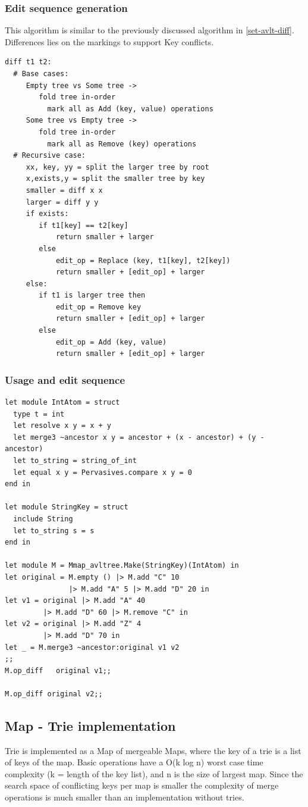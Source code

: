 \documentclass{article}
\begin{document}
\subsubsection{Edit sequence generation}
This algorithm is similar to the previously discussed algorithm in \ref{set-avlt-diff}. Differences lies on the markings to support Key conflicts.

\begin{lstlisting}
diff t1 t2:
  # Base cases:
     Empty tree vs Some tree -> 
     	fold tree in-order 
     	  mark all as Add (key, value) operations
     Some tree vs Empty tree ->
     	fold tree in-order 
     	  mark all as Remove (key) operations
  # Recursive case:
     xx, key, yy = split the larger tree by root
     x,exists,y = split the smaller tree by key
     smaller = diff x x
  	 larger = diff y y
     if exists:
     	if t1[key] == t2[key]
     		return smaller + larger
        else
        	edit_op = Replace (key, t1[key], t2[key])
            return smaller + [edit_op] + larger
     else:
     	if t1 is larger tree then 
        	edit_op = Remove key
            return smaller + [edit_op] + larger
        else 
        	edit_op = Add (key, value)
        	return smaller + [edit_op] + larger
\end{lstlisting}

\subsubsection{Usage and edit sequence}
\begin{lstlisting}
let module IntAtom = struct
  type t = int
  let resolve x y = x + y
  let merge3 ~ancestor x y = ancestor + (x - ancestor) + (y - ancestor)
  let to_string = string_of_int
  let equal x y = Pervasives.compare x y = 0 
end in

let module StringKey = struct
  include String
  let to_string s = s 
end in

let module M = Mmap_avltree.Make(StringKey)(IntAtom) in
let original = M.empty () |> M.add "C" 10 
               |> M.add "A" 5 |> M.add "D" 20 in
let v1 = original |> M.add "A" 40 
         |> M.add "D" 60 |> M.remove "C" in
let v2 = original |> M.add "Z" 4 
         |> M.add "D" 70 in
let _ = M.merge3 ~ancestor:original v1 v2
;;
M.op_diff	original v1;;

M.op_diff original v2;;

\end{lstlisting}


\subsection{Map - Trie implementation}
Trie is implemented as a Map of mergeable Maps, where the key of a trie is a list of keys of the map. Basic operations have a O(k log n) worst case time complexity (k = length of the key list), and n is the size of largest map. Since the search space of conflicting keys per map is smaller the complexity of merge operations is much smaller than an implementation without tries.
\end{document}
